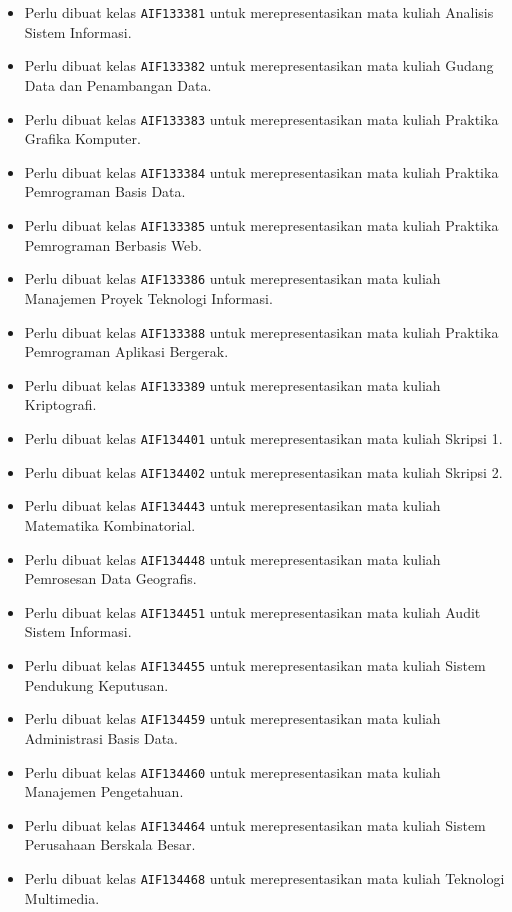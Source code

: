 \begin{enumerate}
\begin{itemize}
		\item Perlu dibuat kelas \texttt{AIF133381} untuk merepresentasikan mata kuliah Analisis Sistem Informasi.
		\item Perlu dibuat kelas \texttt{AIF133382} untuk merepresentasikan mata kuliah Gudang Data dan Penambangan Data.
		\item Perlu dibuat kelas \texttt{AIF133383} untuk merepresentasikan mata kuliah Praktika Grafika Komputer.
		\item Perlu dibuat kelas \texttt{AIF133384} untuk merepresentasikan mata kuliah Praktika Pemrograman Basis Data.
		\item Perlu dibuat kelas \texttt{AIF133385} untuk merepresentasikan mata kuliah Praktika Pemrograman Berbasis Web.
		\item Perlu dibuat kelas \texttt{AIF133386} untuk merepresentasikan mata kuliah Manajemen Proyek Teknologi Informasi.
		\item Perlu dibuat kelas \texttt{AIF133388} untuk merepresentasikan mata kuliah Praktika Pemrograman Aplikasi Bergerak.
		\item Perlu dibuat kelas \texttt{AIF133389} untuk merepresentasikan mata kuliah Kriptografi.
		\item Perlu dibuat kelas \texttt{AIF134401} untuk merepresentasikan mata kuliah Skripsi 1.
		\item Perlu dibuat kelas \texttt{AIF134402} untuk merepresentasikan mata kuliah Skripsi 2.
		\item Perlu dibuat kelas \texttt{AIF134443} untuk merepresentasikan mata kuliah Matematika Kombinatorial.
		\item Perlu dibuat kelas \texttt{AIF134448} untuk merepresentasikan mata kuliah Pemrosesan Data Geografis.
		\item Perlu dibuat kelas \texttt{AIF134451} untuk merepresentasikan mata kuliah Audit Sistem Informasi.
		\item Perlu dibuat kelas \texttt{AIF134455} untuk merepresentasikan mata kuliah Sistem Pendukung Keputusan.
		\item Perlu dibuat kelas \texttt{AIF134459} untuk merepresentasikan mata kuliah Administrasi Basis Data.
		\item Perlu dibuat kelas \texttt{AIF134460} untuk merepresentasikan mata kuliah Manajemen Pengetahuan.
		\item Perlu dibuat kelas \texttt{AIF134464} untuk merepresentasikan mata kuliah Sistem Perusahaan Berskala Besar.
		\item Perlu dibuat kelas \texttt{AIF134468} untuk merepresentasikan mata kuliah Teknologi Multimedia.

\end{itemize}
\end{enumerate}
